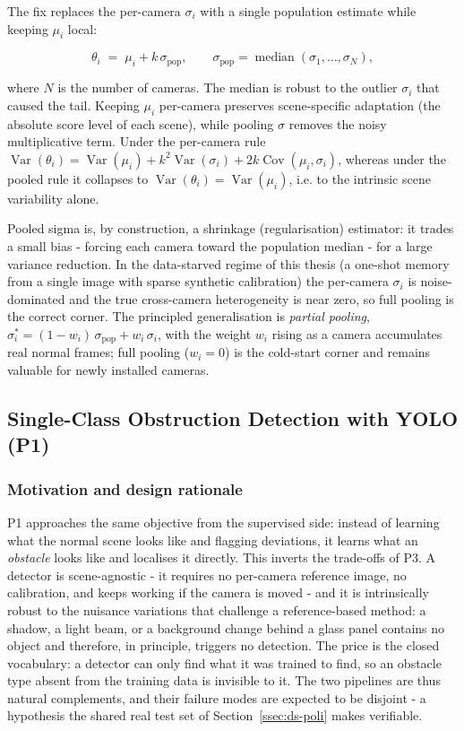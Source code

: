 The fix replaces the per-camera $\sigma_i$ with a single population estimate while
keeping $\mu_i$ local:

\begin{equation}
  \theta_i \;=\; \mu_i + k\,\sigma_{\mathrm{pop}} ,
  \qquad
  \sigma_{\mathrm{pop}} = \operatorname{median}(\sigma_1, \dots, \sigma_N) ,
  \label{eq:pooled}
\end{equation}

where $N$ is the number of cameras. The median is robust to the outlier $\sigma_i$
that caused the tail. Keeping $\mu_i$ per-camera preserves scene-specific
adaptation (the absolute score level of each scene), while pooling $\sigma$
removes the noisy multiplicative term. Under the per-camera rule
$\operatorname{Var}(\theta_i) = \operatorname{Var}(\mu_i) + k^2
\operatorname{Var}(\sigma_i) + 2k\operatorname{Cov}(\mu_i,\sigma_i)$, whereas under
the pooled rule it collapses to $\operatorname{Var}(\theta_i) =
\operatorname{Var}(\mu_i)$, i.e. to the intrinsic scene variability alone.

Pooled sigma is, by construction, a shrinkage (regularisation) estimator: it
trades a small bias - forcing each camera toward the population median - for a
large variance reduction. In the data-starved regime of this thesis (a one-shot
memory from a single image with sparse synthetic calibration) the per-camera
$\sigma_i$ is noise-dominated and the true cross-camera heterogeneity is near
zero, so full pooling is the correct corner. The principled generalisation is
\emph{partial pooling}, $\sigma_i^{\ast} = (1-w_i)\,\sigma_{\mathrm{pop}} +
w_i\,\sigma_i$, with the weight $w_i$ rising as a camera accumulates real normal
frames; full pooling ($w_i = 0$) is the cold-start corner and remains valuable
for newly installed cameras.

\subsection{Single-Class Obstruction Detection with YOLO (P1)}
\label{ssec:p1-method}

\subsubsection{Motivation and design rationale}

P1 approaches the same objective from the supervised side: instead of learning
what the normal scene looks like and flagging deviations, it learns what an
\emph{obstacle} looks like and localises it directly. This inverts the
trade-offs of P3. A detector is scene-agnostic - it requires no per-camera
reference image, no calibration, and keeps working if the camera is moved -
and it is intrinsically robust to the nuisance variations that challenge a
reference-based method: a shadow, a light beam, or a background change behind a
glass panel contains no object and therefore, in principle, triggers no
detection. The price is the closed vocabulary: a detector can only find what it
was trained to find, so an obstacle type absent from the training data is
invisible to it. The two pipelines are thus natural complements, and their
failure modes are expected to be disjoint - a hypothesis the shared real test
set of Section~\ref{ssec:ds-poli} makes verifiable.

